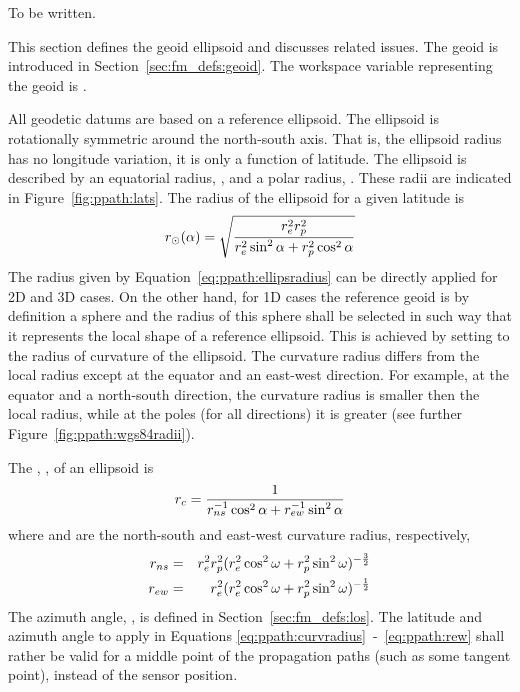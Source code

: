 \label{sec:ppath:3Dgeom}

To be written.



\label{sec:ppath:geoids}

This section defines the geoid ellipsoid and discusses related
issues. The geoid is introduced in Section~\ref{sec:fm_defs:geoid}.
The workspace variable representing the geoid is .


\label{sec:ppath:geoid}

All geodetic datums are based on a reference ellipsoid. The ellipsoid is rotationally symmetric around the
north-south axis. That is, the ellipsoid radius has no longitude
variation, it is only a function of latitude. The ellipsoid is
described by an equatorial radius, , and a polar radius,
. These radii are indicated in Figure~\ref{fig:ppath:lats}.
The radius of the ellipsoid for a given latitude is
\begin{equation}
 r_{\odot}(\alpha) = \sqrt{\frac{r_{e}^2r_{p}^2}
                    {r_{e}^2\sin^2\alpha+r_{p}^2\cos^2\alpha}}
 \label{eq:ppath:ellipsradius} 
\end{equation}
The radius given by Equation~\ref{eq:ppath:ellipsradius} can be
directly applied for 2D and 3D cases. On the other hand, for 1D cases
the reference geoid is by definition a sphere and the radius of this
sphere shall be selected in such way that it represents the local
shape of a reference ellipsoid. This is achieved by setting
\aRds{\odot} to the radius of curvature of the ellipsoid. The
curvature radius differs from the local radius except at the equator
and an east-west direction. For example, at the equator and a
north-south direction, the curvature radius is smaller then the local
radius, while at the poles (for all directions) it is greater
(see further Figure~\ref{fig:ppath:wgs84radii}). 

The , , of an ellipsoid is 
\citep{rodgers:00}
\begin{equation}
 r_{c} = \frac{1}{r_{ns}^{-1}\cos^2 \alpha + r_{ew}^{-1}\sin^2 \alpha}
 \label{eq:ppath:curvradius} 
\end{equation}
where  and  are the north-south and east-west curvature radius, respectively,
\begin{eqnarray}
 r_{ns} &=& r_{e}^2r_{p}^2 (
           r_{e}^2\cos^2\omega+r_{p}^2\sin^2\omega )^{-\frac{3}{2}} \\
 r_{ew} &=& r_{e}^2 (
           r_{e}^2\cos^2\omega+r_{p}^2\sin^2\omega )^{-\frac{1}{2}} 
 \label{eq:ppath:rew} 
\end{eqnarray}
The azimuth angle, \AzmAng, is defined in
Section~\ref{sec:fm_defs:los}. The latitude and azimuth angle to
apply in Equations \ref{eq:ppath:curvradius}~-~\ref{eq:ppath:rew}
shall rather be valid for a middle point of the propagation paths
(such as some tangent point), instead of the sensor position. 

